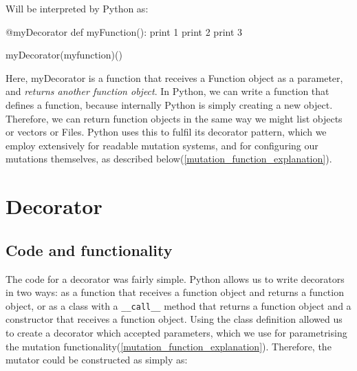 Will be interpreted by Python as: 
\begin{pyglist}[language = python, encoding = utf8, caption = {How Python interprets a decorated function call}, listingname=\textbf{Code Sample}, numbers=left]
@myDecorator
def myFunction():
  print 1
  print 2
  print 3
  
myDecorator(myfunction)()
\end{pyglist} \par
Here, myDecorator is a function that receives a Function object as a parameter, and \emph{returns another function object}. In Python, we can write a function that defines a function, because internally Python is simply creating a new object. Therefore, we can return function objects in the same way we might list objects or vectors or Files. Python uses this to fulfil its decorator pattern, which we employ extensively for readable mutation systems, and for configuring our mutations themselves, as described below(\cref{mutation_function_explanation}). \par

\section{Decorator}
\subsection{Code and functionality}
The code for a decorator was fairly simple. Python allows us to write decorators in two ways: as a function that receives a function object and returns a function object, or as a class with a \texttt{\_\_call\_\_} method that returns a function object and a constructor that receives a function object. Using the class definition allowed us to create a decorator which accepted parameters, which we use for parametrising the mutation functionality(\cref{mutation_function_explanation}). Therefore, the mutator could be constructed as simply as:


